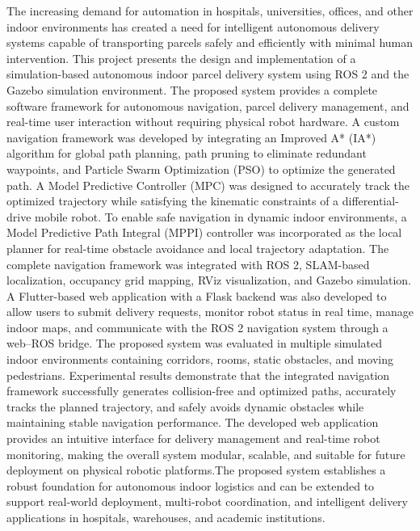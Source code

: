 \documentclass[12pt,a4paper]{report}
\begin{document}
	The increasing demand for automation in hospitals, universities, offices, and other indoor environments has created a need for intelligent autonomous delivery systems capable of transporting parcels safely and efficiently with minimal human intervention. This project presents the design and implementation of a simulation-based autonomous indoor parcel delivery system using ROS 2 and the Gazebo simulation environment. The proposed system provides a complete software framework for autonomous navigation, parcel delivery management, and real-time user interaction without requiring physical robot hardware.
	A custom navigation framework was developed by integrating an Improved A* (IA*) algorithm for global path planning, path pruning to eliminate redundant waypoints, and Particle Swarm Optimization (PSO) to optimize the generated path. A Model Predictive Controller (MPC) was designed to accurately track the optimized trajectory while satisfying the kinematic constraints of a differential-drive mobile robot. To enable safe navigation in dynamic indoor environments, a Model Predictive Path Integral (MPPI) controller was incorporated as the local planner for real-time obstacle avoidance and local trajectory adaptation. The complete navigation framework was integrated with ROS 2, SLAM-based localization, occupancy grid mapping, RViz visualization, and Gazebo simulation. A Flutter-based web application with a Flask backend was also developed to allow users to submit delivery requests, monitor robot status in real time, manage indoor maps, and communicate with the ROS 2 navigation system through a web–ROS bridge. The proposed system was evaluated in multiple simulated indoor environments containing corridors, rooms, static obstacles, and moving pedestrians. Experimental results demonstrate that the integrated navigation framework successfully generates collision-free and optimized paths, accurately tracks the planned trajectory, and safely avoids dynamic obstacles while maintaining stable navigation performance. The developed web application provides an intuitive interface for delivery management and real-time robot monitoring, making the overall system modular, scalable, and suitable for future deployment on physical robotic platforms.The proposed system establishes a robust foundation for autonomous indoor logistics and can be extended to support real-world deployment, multi-robot coordination, and intelligent delivery applications in hospitals, warehouses, and academic institutions.
		\clearpage
	
	\tableofcontents
	\clearpage
	
\end{document}
